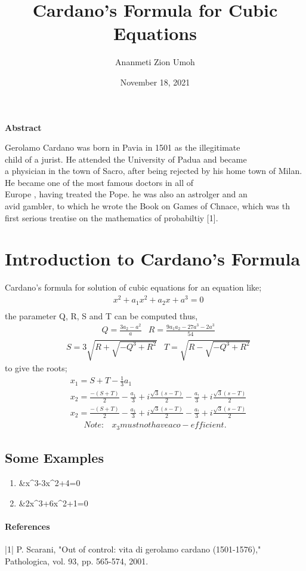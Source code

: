 \documentclass{article}
\title{Cardano's Formula for Cubic Equations}
\author{Ananmeti Zion Umoh}
\date{November 18, 2021}
\begin{document}
	\maketitle
	\begin{center}
		\textbf{Abstract}
	\end{center}
\begin{center}

	Gerolamo Cardano was born in Pavia in 1501 as the illegitimate\\
	child of a jurist. He attended the University of Padua and became\\
	a physician in the town of Sacro, after being rejected by his home
	town of Milan. He became one of the most famous doctors in all of\\
	Europe , having treated the Pope. he was also an astrolger and an\\
	avid gambler, to which he wrote the Book on Games of Chnace, which was th first serious treatise on the mathematics of probabiltiy [1].\\
\end{center}
\section{\textbf{Introduction to Cardano's Formula}}

Cardano's formula for solution of cubic equations for an equation like;
\begin{align*}
	& x^2 + a_1x^2 + a_2x+a^3 = 0\\
\end{align*}
the parameter Q, R, S and T can be computed thus,
\begin{align*}
	&Q=\frac{3a_2-a^2}{a}
	&R=\frac{9a_1a_2-27a^3-2a^3}{54}
\end{align*}
\begin{align*}
	&S=3\sqrt{R+\sqrt{-Q^3+R^2}}
	&T=\sqrt{R-\sqrt{-Q^3+R^2}}
\end{align*}
to give the roots;
\begin{align*}
	&x_1=S+T-\frac{1}{3}a_1\\
	&x_2=\frac{-(S+T)}{2}-\frac{a_1}{3}+i\frac{\sqrt{3}(s-T)}{2}-\frac{a_!}{3}+i\frac{\sqrt{3}(s-T)}{2}\\	&x_2=\frac{-(S+T)}{2}-\frac{a_1}{3}+i\frac{\sqrt{3}(s-T)}{2}-\frac{a_!}{3}+i\frac{\sqrt{3}(s-T)}{2}
\end{align*}
\begin{align*}
	Note: &x_3 must not have a co-efficient.
\end{align*}
\subsection{Some Examples}
\begin{enumerate}
			\item &x^3-3x^2+4=0
			\item &2x^3+6x^2+1=0
\end{enumerate}

\paragraph{\textbf{References}}
|1| P. Scarani, "Out of control: vita di gerolamo cardano (1501-1576),"
Pathologica, vol. 93, pp. 565-574, 2001.
\end{document}
